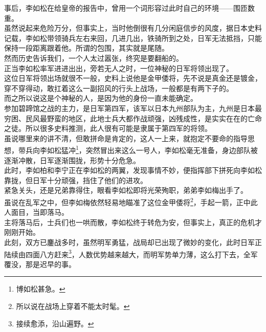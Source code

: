 \begin{multicols}{\theparacolNo}
事后，李如松在给皇帝的报告中，曾用一个词形容过此时自己的环境——围匝数重。\\

虽然说起来危险万分，但事实上，当时他倒很有几分闲庭信步的风度，据日本史料记载，李如松带领骑兵左右来回，几进几出，铁骑所到之处，日军无法抵挡，只能保持一段距离跟着他。所谓的包围，其实就是尾随。\\

然而历史告诉我们，一个人太过嚣张，终究是要翻船的。\\

正当李如松率军进进出出，旁若无人之时，一位神秘的日军将领出现了。\\

这位日军将领出场就很不一般，史料上说他是金甲倭将，先不说是真金还是镀金，穿不穿得动，敢扛着这么一副招风的行头上战场，一般都是有两下子的。\\

而之所以说这是个神秘的人，是因为他的身份一直未能确定。\\

参加碧蹄馆之战的主力，是日军第四军，该军以日本九州部队为主，九州是日本最穷困、民风最野蛮的地区，此地士兵大都作战顽强，凶残成性，是实实在在的亡命之徒。所以很多史料推测，此人很有可能是隶属于第四军的将领。\\

虽说哪里来的讲不清，但敢拼命是肯定的，这人一上来，就抱定不要命的指导思想，带兵向李如松猛冲\footnote{博如松甚急。}，突然冒出来这么一号人，李如松毫无准备，身边部队被逐渐冲散，日军逐渐围拢，形势十分危急。\\

此时，李如柏和李宁正在李如松的两翼，发现事情不妙，便指挥部下拼死向李如松靠拢，但日军十分顽强，挡住了他们的进攻。\\

紧急关头，还是兄弟靠得住，眼看李如松即将光荣殉职，弟弟李如梅出手了。\\

虽说在乱军之中，但李如梅依然轻易地瞄准了这位金甲倭将\footnote{所以说在战场上穿着不能太时髦。}，手起一箭，正中此人面目，当即落马。\\

主将落马后，士兵们也一哄而散，李如松终于转危为安，但事实上，真正的危机才刚刚开始。\\

此刻，双方已鏖战多时，虽然明军勇猛，战局却已出现了微妙的变化，此时日军正陆续由四面八方赶来\footnote{接续愈添，沿山遍野。}，人数优势越来越大，而明军势单力薄，这么打下去，全军覆没，那是迟早的事。\\


\end{multicols}
